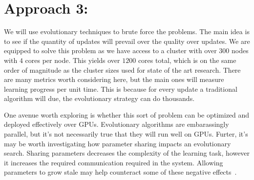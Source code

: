 
\section{Approach 3: }
We will use evolutionary techniques to brute force the problems.
The main idea is to see if the quantity of updates will prevail over the quality over updates.
We are equipped to solve this problem as we have access to a cluster with over $300$ nodes with $4$ cores per node.
This yields over $1200$ cores total, which is on the same order of magnitude as the cluster sizes used for state of the art research.
There are many metrics worth considering here, but the main ones will measure learning progress per unit time.
This is because for every update a traditional algorithm will due, the evolutionary strategy can do thousands.

One avenue worth exploring is whether this sort of problem can be optimized and deployed effectively over GPUs.
Evolutionary algorithms are embarassingly parallel, but it's not necessarily true that they will run well on GPUs.
Furter, it’s may be worth investigating how parameter sharing impacts an evolutionary search.
Sharing parameters decreases the complexity of the learning task, however it increases the required communication required in the system.
Allowing parameters to grow stale may help counteract some of these negative effects~\cite{cui2014exploiting}.
\label{sec:direction3}



